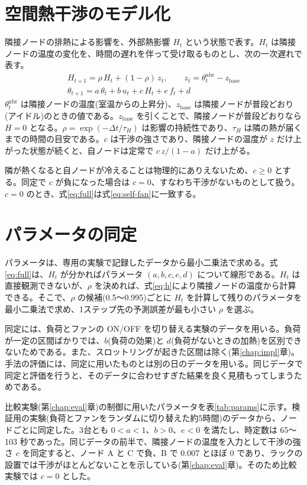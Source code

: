 \section{空間熱干渉のモデル化}\label{sec:method-h}
隣接ノードの排熱による影響を、外部熱影響 $H_t$ という状態で表す。$H_t$ は隣接ノードの温度の変化を、時間の遅れを伴って受け取るものとし、次の一次遅れで表す。
\begin{gather}
  H_{t+1} = \rho\,H_t + (1-\rho)\,z_t,\qquad z_t = \theta^{\mathrm{nbr}}_t - z_{\mathrm{base}}
  \label{eq:h}\\
  \theta_{t+1} = a\,\theta_t + b\,u_t + c\,H_t + e\,f_t + d
  \label{eq:full}
\end{gather}
$\theta^{\mathrm{nbr}}_t$ は隣接ノードの温度(室温からの上昇分)、$z_{\mathrm{base}}$ は隣接ノードが普段どおり(アイドル)のときの値である。$z_{\mathrm{base}}$ を引くことで、隣接ノードが普段どおりなら $H = 0$ となる。$\rho = \exp(-\Delta t/\tau_H)$ は影響の持続性であり、$\tau_H$ は隣の熱が届くまでの時間の目安である。$c$ は干渉の強さであり、隣接ノードの温度が $z$ だけ上がった状態が続くと、自ノードは定常で $c\,z/(1-a)$ だけ上がる。

隣が熱くなると自ノードが冷えることは物理的にありえないため、$c \ge 0$ とする。同定で $c$ が負になった場合は $c = 0$、すなわち干渉がないものとして扱う。$c = 0$ のとき、式\eqref{eq:full}は式\eqref{eq:self-fan}に一致する。

\section{パラメータの同定}\label{sec:method-identify}
パラメータは、専用の実験で記録したデータから最小二乗法で求める。式\eqref{eq:full}は、$H_t$ が分かればパラメータ $(a, b, c, e, d)$ について線形である。$H_t$ は直接観測できないが、$\rho$ を決めれば、式\eqref{eq:h}により隣接ノードの温度から計算できる。そこで、$\rho$ の候補(0.5〜0.995)ごとに $H_t$ を計算して残りのパラメータを最小二乗法で求め、1ステップ先の予測誤差が最も小さい $\rho$ を選ぶ。

同定には、負荷とファンの ON/OFF を切り替える実験のデータを用いる。負荷が一定の区間ばかりでは、$b$(負荷の効果)と $d$(負荷がないときの加熱)を区別できないためである。また、スロットリングが起きた区間は除く(第\ref{chap:impl}章)。手法の評価には、同定に用いたものとは別の日のデータを用いる。同じデータで同定と評価を行うと、そのデータに合わせすぎた結果を良く見積もってしまうためである。

比較実験(第\ref{chap:eval}章)の制御に用いたパラメータを表\ref{tab:params}に示す。検証用の実験(負荷とファンをランダムに切り替えた約5時間)のデータから、ノードごとに同定した。3台とも $0<a<1$、$b>0$、$e<0$ を満たし、時定数は 65〜103 秒であった。同じデータの前半で、隣接ノードの温度を入力として干渉の強さ $c$ を同定すると、ノード A と C で負、B で 0.007 とほぼ 0 であり、ラックの設置では干渉がほとんどないことを示している(第\ref{chap:eval}章)。そのため比較実験では $c = 0$ とした。

